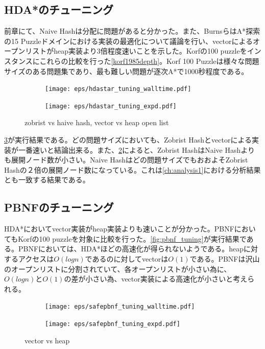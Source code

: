 \documentclass{jsarticle}
\begin{document}
\subsection{HDA*のチューニング}
\label{sec:hdastar_tuning}

前章にて、Naive Hashは分配に問題があると分かった。また、BurnsらはA*探索の15 Puzzleドメインにおける実装の最適化について議論を行い、vectorによるオープンリストがheap実装より3倍程度速いことを示した\cite{burns2012implementing}。Korfの100 puzzleをインスタンスにこれらの比較を行った\ref{korf1985depth}。Korf 100 Puzzleは様々な問題サイズのある問題集であり、最も難しい問題が逐次A*で1000秒程度である。

\begin{figure}
	\centering
	\begin{subfigure}{0.6\columnwidth}
		\texttt{[image: eps/hdastar\_tuning\_walltime.pdf]}
		\label{fig:hdastar_tuning_walltime}
	\end{subfigure}
	\begin{subfigure}{0.6\columnwidth}
		\texttt{[image: eps/hdastar\_tuning\_expd.pdf]}
		\label{fig:hdastar_tuning_expd}
	\end{subfigure}
	\label{fig:hdastar_tuning}
	\caption{zobrist vs haive hash, vector vs heap open list}
\end{figure}

\ref{fig:hdastar_tuning}が実行結果である。どの問題サイズにおいても、Zobrist Hashとvectorによる実装が一番速いと結論出来る。また、\ref{fig:hdastar_tuning_expd}によると、Zobrist HashはNaive Hashよりも展開ノード数が小さい。Naive Hashはどの問題サイズでもおおよそZobrist Hashの２倍の展開ノード数になっている。これは\ref{ch:analysis1}における分析結果とも一致する結果である。


\subsection{PBNFのチューニング}
\label{sec:pbnf_tuning}

HDA*においてvector実装がheap実装よりも速いことが分かった。PBNFにおいてもKorfの100 puzzleを対象に比較を行った。\ref{fig:pbnf_tuning}が実行結果である。PBNFにおいては、HDA*ほどの高速化が得られないようである。heapに対するアクセスは$O(logn)$であるのに対してvectorは$O(1)$である。PBNFは沢山のオープンリストに分割されていて、各オープンリストが小さい為に、$O(logn)$と$O(1)$の差が小さい為、vector実装による高速化が小さいと考えられる。


\begin{figure}
	\centering
	\begin{subfigure}{0.4\columnwidth}
		\texttt{[image: eps/safepbnf\_tuning\_walltime.pdf]}
		\label{fig:safepbnf_tuning_walltime}
	\end{subfigure}
	\begin{subfigure}{0.4\columnwidth}
		\texttt{[image: eps/safepbnf\_tuning\_expd.pdf]}
		\label{fig:safepbnf_tuning_expd}
	\end{subfigure}
	\label{fig:safepbnf_tuning}
	\caption{vector vs heap}
\end{figure}
\end{document}
